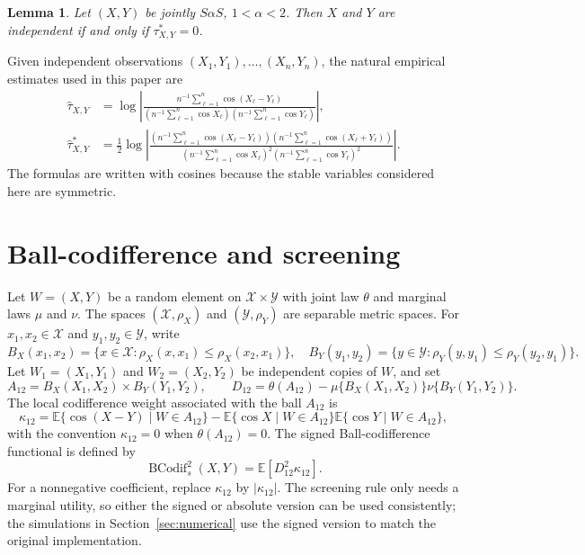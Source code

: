 \documentclass[11pt]{article}
\newtheorem{lemma}[theorem]{Lemma}
\theoremstyle{definition}
\newcommand{\E}{\mathbb{E}}
\newcommand{\calX}{\mathcal{X}}
\newcommand{\calY}{\mathcal{Y}}
\newcommand{\BCodif}{\operatorname{BCodif}}
\begin{document}
\begin{lemma}\label{lem:extended_independence}
Let \((X,Y)\) be jointly \(S\alpha S\), \(1<\alpha<2\).  Then \(X\) and \(Y\) are independent if and only if \(\tau^*_{X,Y}=0\).
\end{lemma}

Given independent observations \((X_1,Y_1),\ldots,(X_n,Y_n)\), the natural empirical estimates used in this paper are
\begin{align}
\widehat\tau_{X,Y}
&=\log\left|\frac{n^{-1}\sum_{\ell=1}^n\cos(X_\ell-Y_\ell)}
{\left(n^{-1}\sum_{\ell=1}^n\cos X_\ell\right)
 \left(n^{-1}\sum_{\ell=1}^n\cos Y_\ell\right)}\right|,\label{eq:hat_tau}\\[3pt]
\widehat\tau^*_{X,Y}
&=\frac{1}{2}\log\left|\frac{\left(n^{-1}\sum_{\ell=1}^n\cos(X_\ell-Y_\ell)\right)
\left(n^{-1}\sum_{\ell=1}^n\cos(X_\ell+Y_\ell)\right)}
{\left(n^{-1}\sum_{\ell=1}^n\cos X_\ell\right)^2
 \left(n^{-1}\sum_{\ell=1}^n\cos Y_\ell\right)^2}\right| .\label{eq:hat_tau_star}
\end{align}
The formulas are written with cosines because the stable variables considered here are symmetric.  %

\section{Ball-codifference and screening}\label{sec:bcodif}

Let \(W=(X,Y)\) be a random element on \(\calX\times\calY\) with joint law \(\theta\) and marginal laws \(\mu\) and \(\nu\).  The spaces \((\calX,\rho_X)\) and \((\calY,\rho_Y)\) are separable metric spaces.  For \(x_1,x_2\in\calX\) and \(y_1,y_2\in\calY\), write
\[
B_X(x_1,x_2)=\{x\in\calX:\rho_X(x,x_1)\leq \rho_X(x_2,x_1)\},
\quad
B_Y(y_1,y_2)=\{y\in\calY:\rho_Y(y,y_1)\leq \rho_Y(y_2,y_1)\}.
\]
Let \(W_1=(X_1,Y_1)\) and \(W_2=(X_2,Y_2)\) be independent copies of \(W\), and set
\[
A_{12}=B_X(X_1,X_2)\times B_Y(Y_1,Y_2),\qquad
D_{12}=\theta(A_{12})-\mu\{B_X(X_1,X_2)\}\nu\{B_Y(Y_1,Y_2)\}.
\]
The local codifference weight associated with the ball \(A_{12}\) is
\begin{equation}\label{eq:local_codiff}
\kappa_{12}
=\E\{\cos(X-Y)\mid W\in A_{12}\}
-\E\{\cos X\mid W\in A_{12}\}\E\{\cos Y\mid W\in A_{12}\},
\end{equation}
with the convention \(\kappa_{12}=0\) when \(\theta(A_{12})=0\).  The signed Ball-codifference functional is defined by
\begin{equation}\label{eq:bcodif_population}
\BCodif_s^2(X,Y)=\E\left[D_{12}^2\kappa_{12}\right].
\end{equation}
For a nonnegative coefficient, replace \(\kappa_{12}\) by \(|\kappa_{12}|\).  The screening rule only needs a marginal utility, so either the signed or absolute version can be used consistently; the simulations in Section~\ref{sec:numerical} use the signed version to match the original implementation.
\end{document}
